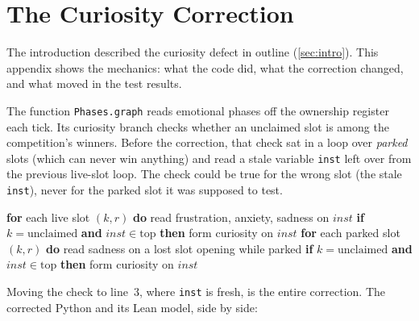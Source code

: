 \documentclass[11pt]{article}
\newcommand{\leanus}{\textunderscore\allowbreak}
\newcommand{\lean}[1]{{\let\_\leanus\texttt{#1}}}
\theoremstyle{remark}
\begin{document}
\section{The Curiosity Correction}
\label{app:curiosity}

The introduction described the curiosity defect in outline (\cref{sec:intro}). This
appendix shows the mechanics: what the code did, what the correction changed, and what
moved in the test results.

The function \lean{Phases.graph} reads emotional phases off the ownership register each
tick. Its curiosity branch checks whether an unclaimed slot is among the competition's
winners. Before the correction, that check sat in a loop over \emph{parked} slots (which can
never win anything) and read a stale variable \lean{inst} left over from the previous
live-slot loop. The check could be true for the wrong slot (the stale \lean{inst}), never
for the parked slot it was supposed to test.

\begin{algorithm}[h]
\caption{The curiosity reading in \lean{Phases.graph}, before and after}
\label{alg:curiosity}
\begin{algorithmic}[1]
\STATE \textbf{for} each live slot $(k, r)$ \textbf{do} 
\STATE \quad read frustration, anxiety, sadness on $inst$
\STATE \quad \textbf{if} $k = \text{unclaimed}$ \textbf{and} $inst \in \text{top}$ \textbf{then} form curiosity on $inst$ 
\STATE \textbf{for} each parked slot $(k, r)$ \textbf{do} 
\STATE \quad read sadness on a lost slot opening while parked
\STATE \quad \textbf{if} $k = \text{unclaimed}$ \textbf{and} $inst \in \text{top}$ \textbf{then} form curiosity on $inst$ 
\end{algorithmic}
\end{algorithm}

Moving the check to line~3, where \lean{inst} is fresh, is the entire correction. The
corrected Python and its Lean model, side by side:
\end{document}
